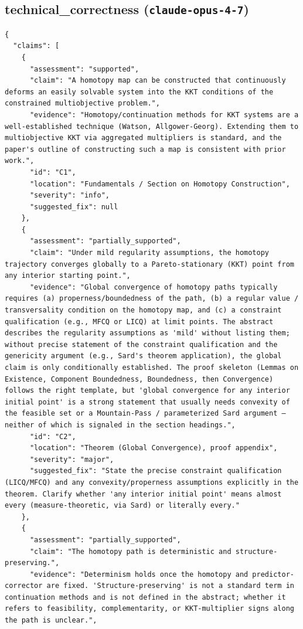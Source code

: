 \documentclass[11pt]{article}
\begin{document}
\subsection*{technical_correctness (\texttt{claude-opus-4-7})}
\begin{verbatim}
{
  "claims": [
    {
      "assessment": "supported",
      "claim": "A homotopy map can be constructed that continuously deforms an easily solvable system into the KKT conditions of the constrained multiobjective problem.",
      "evidence": "Homotopy/continuation methods for KKT systems are a well-established technique (Watson, Allgower-Georg). Extending them to multiobjective KKT via aggregated multipliers is standard, and the paper's outline of constructing such a map is consistent with prior work.",
      "id": "C1",
      "location": "Fundamentals / Section on Homotopy Construction",
      "severity": "info",
      "suggested_fix": null
    },
    {
      "assessment": "partially_supported",
      "claim": "Under mild regularity assumptions, the homotopy trajectory converges globally to a Pareto-stationary (KKT) point from any interior starting point.",
      "evidence": "Global convergence of homotopy paths typically requires (a) properness/boundedness of the path, (b) a regular value / transversality condition on the homotopy map, and (c) a constraint qualification (e.g., MFCQ or LICQ) at limit points. The abstract describes the regularity assumptions as 'mild' without listing them; without precise statement of the constraint qualification and the genericity argument (e.g., Sard's theorem application), the global claim is only conditionally established. The proof skeleton (Lemmas on Existence, Component Boundedness, Boundedness, then Convergence) follows the right template, but 'global convergence for any interior initial point' is a strong statement that usually needs convexity of the feasible set or a Mountain-Pass / parameterized Sard argument — neither of which is signaled in the section headings.",
      "id": "C2",
      "location": "Theorem (Global Convergence), proof appendix",
      "severity": "major",
      "suggested_fix": "State the precise constraint qualification (LICQ/MFCQ) and any convexity/properness assumptions explicitly in the theorem. Clarify whether 'any interior initial point' means almost every (measure-theoretic, via Sard) or literally every."
    },
    {
      "assessment": "partially_supported",
      "claim": "The homotopy path is deterministic and structure-preserving.",
      "evidence": "Determinism holds once the homotopy and predictor-corrector are fixed. 'Structure-preserving' is not a standard term in continuation methods and is not defined in the abstract; whether it refers to feasibility, complementarity, or KKT-multiplier signs along the path is unclear.",

\end{verbatim}
\end{document}
